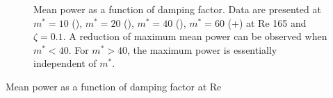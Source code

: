 \begin{figure}

\setlength{\unitlength}{\textwidth}

  \caption{Mean power as a function of damping factor. Data are presented at $m^*=10$ (), $m^*=20$ (), $m^*=40$ (), $m^*=60$ (+) at Re 165 and $\zeta=0.1$. A reduction of maximum mean power can be observed when $m^*<40$. For $m^*>40$, the maximum power is essentially independent of $m^*$.}
    \label{fig:m_star_collapsed}
\end{figure}



Mean power as a function of damping factor at Re